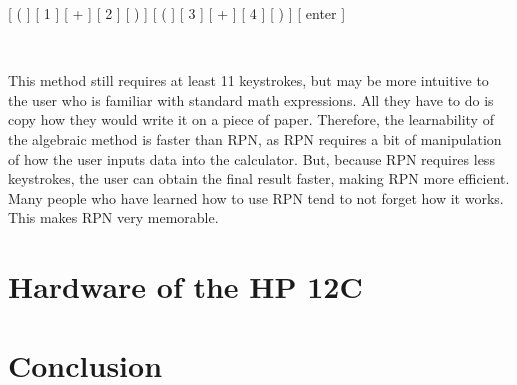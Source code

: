 \documentclass{article}
\begin{document}
\centerline{[ ( ] [ 1 ] [ + ] [ 2 ] [ ) ] [ ( ] [ 3 ] [ + ] [ 4 ] [ ) ] [ enter ]}
\

This method still requires at least 11 keystrokes, but may be more intuitive to the user who is familiar with standard math expressions.  All they have to do is copy how they would write it on a piece of paper.  Therefore, the learnability of the algebraic method is faster than RPN, as RPN requires a bit of manipulation of how the user inputs data into the calculator.  But, because RPN requires less keystrokes, the user can obtain the final result faster, making RPN more efficient.  Many people who have learned how to use RPN tend to not forget how it works.  This makes RPN very memorable.

\section{Hardware of the HP 12C}
\label{Hardware of the HP 12C}

\section{Conclusion}
\label{Conclusion}
\end{document}
